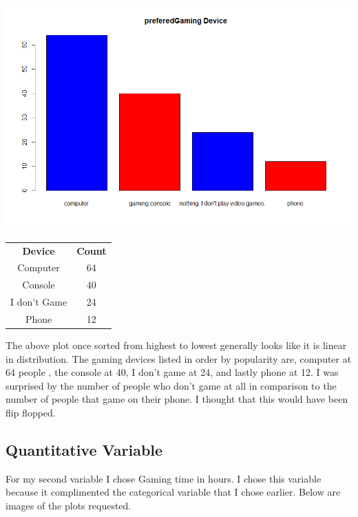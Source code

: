 \documentclass[letterpaper, onecolumn,10pt]{IEEEtran}
\begin{document}
                \includegraphics[width=\textwidth]{week3/Images/Histogram1.png}
                \begin{table}[H]
                    \begin{tabular}{|c|c|}
                        \textbf{Device} & \textbf{Count}\\
                        Computer & 64\\
                        Console & 40\\
                        I don't Game & 24\\
                        Phone & 12\\
                    \end{tabular}
                \end{table}
                The above plot once sorted from highest to lowest generally looks like it is linear in distribution. The gaming devices listed in order by popularity are, computer at 64 people , the console at 40, I don't game at 24, and lastly phone at 12. I was surprised by the number of people who don't game at all in comparison to the number of people that game on their phone. I thought that this would have been flip flopped.\\
                
            \subsection{Quantitative Variable}
                For my second variable I chose Gaming time in hours. I chose this variable because it complimented the categorical variable that I chose earlier. Below are images of the plots requested.\\
                
\end{document}
